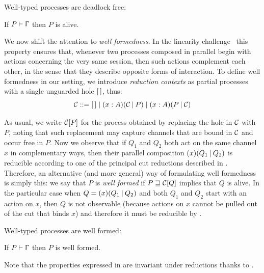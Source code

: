 Well-typed \Calculus processes are deadlock free:

\begin{theorem}
    \label{thm:df}
    If $\wtp{P}\Context$ then $P$ is alive.
\end{theorem}

We now shift the attention to \emph{well formedness}. In the linearity
challenge~\cite{CarboneEtAl24} this property ensures that, whenever two
processes composed in parallel begin with actions concerning the very same
session, then such actions complement each other, in the sense that they
describe opposite forms of interaction. To define well formedness in our
setting, we introduce \emph{reduction contexts} as partial processes with a
single unguarded hole $[\,]$, thus:
\[
    \ReductionContext ::= \Hole \mid \Cut[A]\x\ReductionContext{P} \mid \Cut[A]\x{P}\ReductionContext
\]

As usual, we write $\mathcal{C}[P]$ for the process obtained by replacing
the hole in $\mathcal{C}$ with $P$, noting that such replacement may
capture channels that are bound in $\mathcal{C}$ and occur free in $P$.
%
Now we observe that if $Q_1$ and $Q_2$ both act on the same channel $x$ in
complementary ways, then their parallel composition $\Cut\x{Q_1}{Q_2}$ is
reducible according to one of the principal cut reductions described in
. Therefore, an alternative (and more general) way of
formulating well formedness is simply this:
%
we say that $P$ is \emph{well formed} if $P \sqsupseteq \mathcal{C}[Q]$ implies
that $Q$ is alive. In the particular case when $Q = \Cut\x{Q_1}{Q_2}$ and both
$Q_1$ and $Q_2$ start with an action on $x$, then $Q$ is not observable (because
actions on $x$ cannot be pulled out of the cut that binds $x$) and therefore it
must be reducible by .

Well-typed processes are well formed:

\begin{theorem}
    \label{thm:type-safety}
    If $\wtp{P}\Context$ then $P$ is well formed.
\end{theorem}

Note that the properties expressed in  are
invariant under reductions thanks to .
